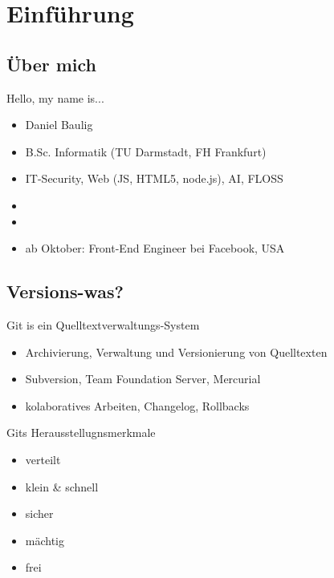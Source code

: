 

\frame{
    \titlepage
}


\section{Einführung}
\subsection{Über mich}

\begin{frame}{Hello, my name is...}
    \begin{itemize}
        \item<1-> Daniel Baulig
        \item<2-> B.Sc. Informatik (TU Darmstadt, FH Frankfurt)
        \item<3-> IT-Security, Web (JS, HTML5, node.js), AI, FLOSS
        \item<4-> 
        \item<5-> 
        \item<7-> ab Oktober: Front-End Engineer bei Facebook, USA
    \end{itemize}
    
\end{frame}

\subsection{Versions-was?}

\begin{frame}{Git is ein Quelltextverwaltungs-System}
    \begin{itemize}[<+->]
        \item Archivierung, Verwaltung und Versionierung von Quelltexten
        \item Subversion, Team Foundation Server, Mercurial
        \item kolaboratives Arbeiten, Changelog, Rollbacks
    \end{itemize}
\end{frame}

\begin{frame}{Gits Herausstellugnsmerkmale}
    \begin{itemize}[<+->]
        \item \alert<6>{verteilt}
        \item klein \& schnell
        \item \alert<6>{sicher}
        \item \alert<6>{mächtig}
        \item frei
    \end{itemize}
\end{frame}

